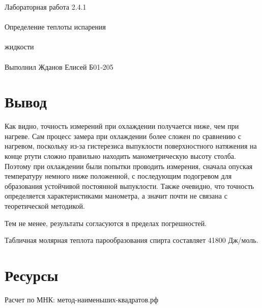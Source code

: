 \documentclass{astroedu-lab}
\begin{document}
\begin{problem}{\huge Лабораторная работа 2.4.1\\\\Определение теплоты испарения\\\\жидкости\\\\Выполнил Жданов Елисей Б01-205}
\section{Вывод}

Как видно, точность измерений при охлаждении получается ниже, чем при нагреве. Сам процесс замера при охлаждении более сложен по сравнению с нагревом, поскольку из-за гистерезиса выпуклости поверхностного натяжения на конце ртути сложно правильно находить манометрическую высоту столба. Поэтому при охлаждении были попытки проводить измерения, сначала опуская температуру немного ниже положенной, с последующим подогревом для образования устойчивой постоянной выпуклости. Также очевидно, что точность определяется характеристиками манометра, а значит почти не связана с теоретической методикой.

Тем не менее, результаты согласуются в пределах погрешностей.

Табличная молярная теплота парообразования спирта составляет 41800 Дж/моль.

\section{Ресурсы}

Расчет по МНК: метод-наименьших-квадратов.рф

\end{problem}
\end{document}
